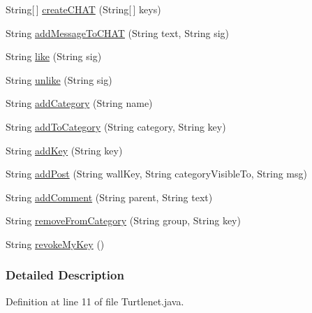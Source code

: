 \begin{DoxyCompactItemize}
\item 
String\mbox{[}$\,$\mbox{]} \hyperlink{interfaceballmerpeak_1_1turtlenet_1_1client_1_1Turtlenet_a73d0ea7f23c65c50b767ad11a15eb551}{create\-C\-H\-A\-T} (String\mbox{[}$\,$\mbox{]} keys)
\item 
String \hyperlink{interfaceballmerpeak_1_1turtlenet_1_1client_1_1Turtlenet_a21764196c7d0327729b959b3b989390f}{add\-Message\-To\-C\-H\-A\-T} (String text, String sig)
\item 
String \hyperlink{interfaceballmerpeak_1_1turtlenet_1_1client_1_1Turtlenet_a53b64b52b96b7867401e49a98ad3c56c}{like} (String sig)
\item 
String \hyperlink{interfaceballmerpeak_1_1turtlenet_1_1client_1_1Turtlenet_a06c7c35b8729183e426c463fbff37b6a}{unlike} (String sig)
\item 
String \hyperlink{interfaceballmerpeak_1_1turtlenet_1_1client_1_1Turtlenet_a2ef6a7f00e36033f8dc013f9a4de2dff}{add\-Category} (String name)
\item 
String \hyperlink{interfaceballmerpeak_1_1turtlenet_1_1client_1_1Turtlenet_ae9cd677b3fa8a8a9114297e58047abe3}{add\-To\-Category} (String category, String key)
\item 
String \hyperlink{interfaceballmerpeak_1_1turtlenet_1_1client_1_1Turtlenet_aefdafb728b08fcd230ed1ca26bf4ce9f}{add\-Key} (String key)
\item 
String \hyperlink{interfaceballmerpeak_1_1turtlenet_1_1client_1_1Turtlenet_a820a403aab7aeaa167cfef0f9a57c47e}{add\-Post} (String wall\-Key, String category\-Visible\-To, String msg)
\item 
String \hyperlink{interfaceballmerpeak_1_1turtlenet_1_1client_1_1Turtlenet_a5b9f57137f7abaca7713840d42918434}{add\-Comment} (String parent, String text)
\item 
String \hyperlink{interfaceballmerpeak_1_1turtlenet_1_1client_1_1Turtlenet_a3428354990f73f31969b9965ac84f279}{remove\-From\-Category} (String group, String key)
\item 
String \hyperlink{interfaceballmerpeak_1_1turtlenet_1_1client_1_1Turtlenet_a8630df1f1be5f09e7a258d2f8ab00feb}{revoke\-My\-Key} ()
\end{DoxyCompactItemize}


\subsubsection{Detailed Description}


Definition at line 11 of file Turtlenet.\-java.



